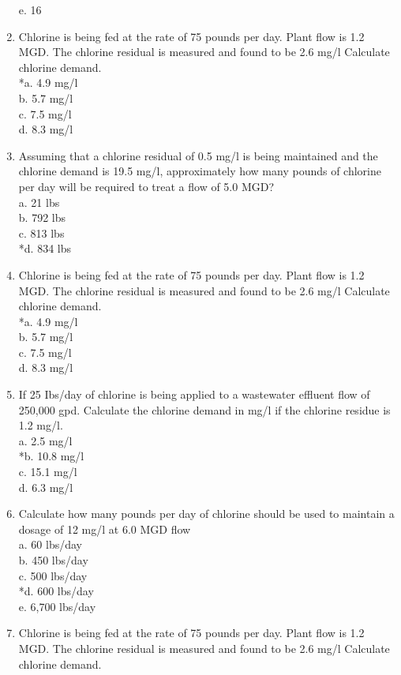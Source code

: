 \begin{enumerate}
e. 16 \\
\item Chlorine is being fed at the rate of 75 pounds per day. Plant flow is 1.2 MGD. The chlorine residual is measured and found to be 2.6 mg/l Calculate chlorine demand.\\
*a. 4.9 mg/l \\
b. 5.7 mg/l \\
c. 7.5 mg/l \\
d. 8.3 mg/l \\
\item Assuming that a chlorine residual of 0.5 mg/l is being maintained and the chlorine demand is 19.5 mg/l, approximately how many pounds of chlorine per day will be required to treat a flow of 5.0 MGD?\\
a. 21 lbs \\
b. 792 lbs \\
c. 813 lbs \\
*d. 834 lbs \\
\item Chlorine is being fed at the rate of 75 pounds per day. Plant flow is 1.2 MGD. The chlorine residual is measured and found to be 2.6 mg/l Calculate chlorine demand.\\
*a. 4.9 mg/l \\
b. 5.7 mg/l \\
c. 7.5 mg/l \\
d. 8.3 mg/l \\
\item If 25 Ibs/day of chlorine is being applied to a wastewater effluent flow of 250,000 gpd. Calculate the chlorine demand in mg/l if the chlorine residue is 1.2 mg/l.\\
a. 2.5 mg/l \\
*b. 10.8 mg/l \\
c. 15.1 mg/l \\
d. 6.3 mg/l \\
\item Calculate how many pounds per day of chlorine should be used to maintain a dosage of 12 mg/l at 6.0 MGD flow\\
a. 60 lbs/day \\
b. 450 lbs/day \\
c. 500 lbs/day \\
*d. 600 lbs/day \\
e. 6,700 lbs/day \\
\item Chlorine is being fed at the rate of 75 pounds per day. Plant flow is 1.2 MGD. The chlorine residual is measured and found to be 2.6 mg/l Calculate chlorine demand. \\

\end{enumerate}
